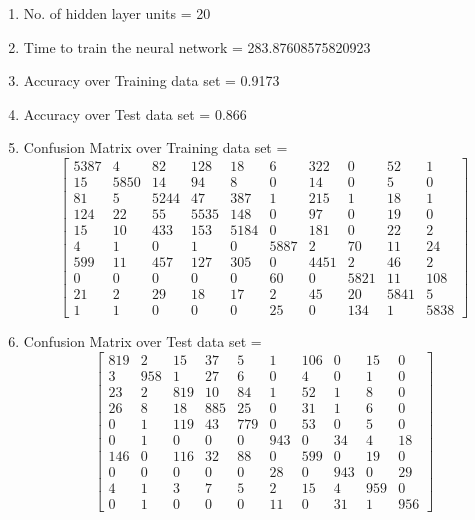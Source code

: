 \documentclass[11pt]{article}
\begin{document}
\hline
\begin{enumerate}
\item No. of hidden layer units = 20
\item Time to train the neural network = 283.87608575820923
\item Accuracy over Training data set = 0.9173
\item Accuracy over Test data set = 0.866
\item Confusion Matrix over Training data set = 
\begin{equation}
  \begin{bmatrix}
5387 & 4 & 82 & 128 & 18 & 6 & 322 & 0 & 52 & 1\\
15 & 5850 & 14 & 94 & 8 & 0 & 14 & 0 & 5 & 0\\
81 & 5 & 5244 & 47 & 387 & 1 & 215 & 1 & 18 & 1\\
124 & 22 & 55 & 5535 & 148 & 0 & 97 & 0 & 19 & 0\\
15 & 10 & 433 & 153 & 5184 & 0 & 181 & 0 & 22 & 2\\
4 & 1 & 0 & 1 & 0 & 5887 & 2 & 70 & 11 & 24\\
599 & 11 & 457 & 127 & 305 & 0 & 4451 & 2 & 46 & 2\\
0 & 0 & 0 & 0 & 0 & 60 & 0 & 5821 & 11 & 108\\
21 & 2 & 29 & 18 & 17 & 2 & 45 & 20 & 5841 & 5\\
1 & 1 & 0 & 0 & 0 & 25 & 0 & 134 & 1 & 5838
  \end{bmatrix}
\end{equation}
\item Confusion Matrix over Test data set = 
\begin{equation}
  \begin{bmatrix}
819 & 2 & 15 & 37 & 5 & 1 & 106 & 0 & 15 & 0\\
3 & 958 & 1 & 27 & 6 & 0 & 4 & 0 & 1 & 0\\
23 & 2 & 819 & 10 & 84 & 1 & 52 & 1 & 8 & 0\\
26 & 8 & 18 & 885 & 25 & 0 & 31 & 1 & 6 & 0\\
0 & 1 & 119 & 43 & 779 & 0 & 53 & 0 & 5 & 0\\
0 & 1 & 0 & 0 & 0 & 943 & 0 & 34 & 4 & 18\\
146 & 0 & 116 & 32 & 88 & 0 & 599 & 0 & 19 & 0\\
0 & 0 & 0 & 0 & 0 & 28 & 0 & 943 & 0 & 29\\
4 & 1 & 3 & 7 & 5 & 2 & 15 & 4 & 959 & 0\\
0 & 1 & 0 & 0 & 0 & 11 & 0 & 31 & 1 & 956
  \end{bmatrix}
\end{equation}
\end{enumerate}
\end{document}
